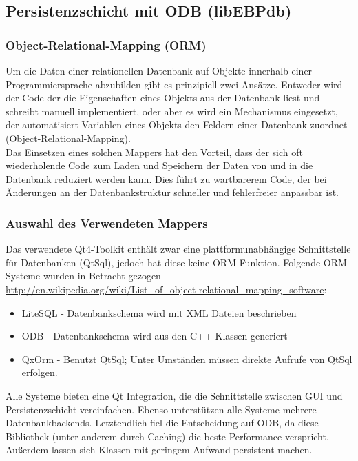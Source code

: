 \subsection{Persistenzschicht mit ODB (libEBPdb)}

\subsubsection{Object-Relational-Mapping (ORM)}
Um die Daten einer relationellen Datenbank auf Objekte innerhalb einer Programmiersprache abzubilden gibt es prinzipiell zwei Ansätze.
Entweder wird der Code der die Eigenschaften eines Objekts aus der Datenbank liest und schreibt manuell implementiert, oder aber es wird ein Mechanismus eingesetzt, der automatisiert Variablen eines Objekts den Feldern einer Datenbank zuordnet (Object-Relational-Mapping).\\
Das Einsetzen eines solchen Mappers hat den Vorteil, dass der sich oft wiederholende Code zum Laden und Speichern der Daten von und in die Datenbank reduziert werden kann. Dies führt zu wartbarerem Code, der bei Änderungen an der Datenbankstruktur schneller und fehlerfreier anpassbar ist.

\subsubsection{Auswahl des Verwendeten Mappers}
Das verwendete Qt4-Toolkit enthält zwar eine plattformunabhängige Schnittstelle für Datenbanken (QtSql), jedoch hat diese keine ORM Funktion.
Folgende ORM-Systeme wurden in Betracht gezogen\\
\url{http://en.wikipedia.org/wiki/List_of_object-relational_mapping_software}:
\begin{itemize}
	\item LiteSQL - Datenbankschema wird mit XML Dateien beschrieben
	\item ODB - Datenbankschema wird aus den C++ Klassen generiert
	\item QxOrm - Benutzt QtSql; Unter Umständen müssen direkte Aufrufe von QtSql erfolgen. \cite{QxOrm_Tutorial}
\end{itemize}
Alle Systeme bieten eine Qt Integration, die die Schnittstelle zwischen GUI und Persistenzschicht vereinfachen.
Ebenso unterstützen alle Systeme mehrere Datenbankbackends.
Letztendlich fiel die Entscheidung auf ODB, da diese Bibliothek (unter anderem durch Caching) die beste Performance verspricht.
Außerdem lassen sich Klassen mit geringem Aufwand persistent machen.

